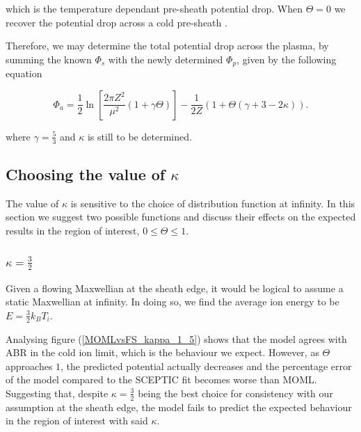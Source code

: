\documentclass{article}
\begin{document}
\noindent which is the temperature dependant pre-sheath potential drop.
When $\Theta = 0$ we recover the potential drop across a cold pre-sheath \cite{Stangeby1986}.

\smallskip

Therefore, we may determine the total potential drop across the plasma, by summing the known
$\Phi_s$ with the newly determined $\Phi_p$, given by the following equation

\begin{equation}\label{eq:FSpotential}
\Phi_a =  \frac{1}{2}\ln{\left[\frac{2\pi Z^2}{\mu^2}(1 + \gamma \Theta)\right]} - \frac{1}{2Z}\left(1 + \Theta\left(\gamma + 3 -2\kappa\right)\right).
\end{equation}

\smallskip

\noindent where $\gamma = \frac{5}{3}$ and $\kappa$ is still to be determined.

\subsection{Choosing the value of $\kappa$}

\medskip

The value of $\kappa$ is sensitive to the choice of distribution function at infinity. In this
section we suggest two possible functions and discuss their effects on the expected results in the region of interest, 
$0 \leq \Theta \leq 1$.

\subsubsection{$\kappa = \frac{3}{2}$}

\medskip

Given a flowing Maxwellian at the sheath edge, it would be logical to assume a static Maxwellian at infinity.
In doing so, we find the average ion energy to be $E = \frac{3}{2}k_B T_i$.

\medskip

Analysing figure (\ref{MOMLvsFS_kappa_1_5}) shows that the model agrees with ABR in the cold ion limit, which is the behaviour we 
expect. However, as $\Theta$ approaches $1$, the predicted potential actually decreases and the percentage 
error of the model compared to the SCEPTIC fit becomes worse than MOML. Suggesting that, despite $\kappa = \frac{3}{2}$ being the best choice for consistency with our assumption
at the sheath edge, the model fails to predict the expected behaviour in the region of interest with said $\kappa$.
\end{document}
